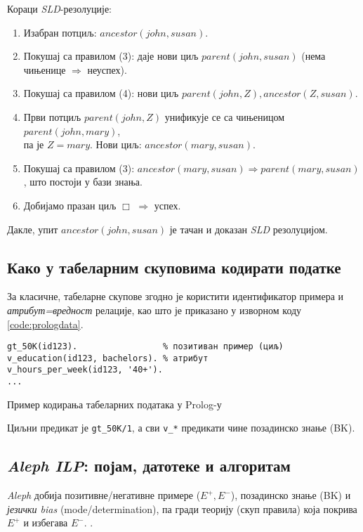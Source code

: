 \noindent Кораци \emph{SLD}-резолуције:
\begin{enumerate}
  \item Изабран потциљ: $ancestor(john, susan)$.
  \item Покушај са правилом (3): даје нови циљ $parent(john, susan)$ (нема чињенице $\Rightarrow$ неуспех).
  \item Покушај са правилом (4): нови циљ $parent(john, Z), ancestor(Z, susan)$.
  \item Први потциљ $parent(john, Z)$ унификује се са чињеницом $parent(john, mary)$,\\
  па је $Z = mary$. Нови циљ: $ancestor(mary, susan)$.
  \item Покушај са правилом (3): $ancestor(mary, susan) \Rightarrow parent(mary, susan)$, што постоји у бази знања.
  \item Добијамо празан циљ $\Box$ $\Rightarrow$ успех.
\end{enumerate} \cite{sld_resolution}

Дакле, упит $ancestor(john, susan)$ је тачан и доказан \emph{SLD} резолуцијом.

\subsection{Како у табеларним скуповима кодирати податке}
За класичне, табеларне скупове згодно је користити идентификатор примера и \emph{атрибут=вредност} релације, као што је приказано у изворном коду \ref{code:prologdata}.

\begin{listing}[H]
\begin{verbatim}
gt_50K(id123).                 % позитиван пример (циљ)
v_education(id123, bachelors). % атрибут
v_hours_per_week(id123, '40+').
...
\end{verbatim}
\caption{Пример кодирања табеларних података у Prolog-у}
\label{code:prologdata}
\end{listing}


Циљни предикат је \verb|gt_50K/1|, а сви \verb|v_*| предикати чине позадинско знање (BK).

\subsection{\emph{Aleph ILP}: појам, датотеке и алгоритам}
\emph{Aleph} добија позитивне/негативне примере (\(E^+,E^-\)), позадинско знање (BK) и \emph{језички bias} (mode/determination), па гради теорију (скуп правила) која покрива \(E^+\) и избегава \(E^-\). \cite{aleph_manual}.

